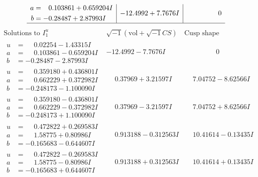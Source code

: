 \documentclass[1p]{elsarticle_modified}
\theoremstyle{definition}
\newcommand{\I}{\sqrt{-1}}
\begin{document}
$$\begin{array}{c|c|c}
\begin{aligned}
a &= \phantom{-}0.103861 + 0.659204 I \\
b &= -0.28487 + 2.87993 I\end{aligned}
 & -12.4992 + 7.7676 I & \phantom{-0.000000 } 0\\
 \hline 
 \end{array}$$\newpage$$\begin{array}{c|c|c}  
\text{Solutions to }I^u_{1}& \I (\text{vol} + \sqrt{-1}CS) & \text{Cusp shape}\\
 \hline 
\begin{aligned}
u &= \phantom{-}0.02254 - 1.43315 I \\
a &= \phantom{-}0.103861 - 0.659204 I \\
b &= -0.28487 - 2.87993 I\end{aligned}
 & -12.4992 - 7.7676 I & \phantom{-0.000000 } 0 \\ \hline\begin{aligned}
u &= \phantom{-}0.359180 + 0.436801 I \\
a &= \phantom{-}0.662229 + 0.372982 I \\
b &= -0.248173 - 1.100090 I\end{aligned}
 & \phantom{-}0.37969 + 3.21597 I & \phantom{-}7.04752 - 8.62566 I \\ \hline\begin{aligned}
u &= \phantom{-}0.359180 - 0.436801 I \\
a &= \phantom{-}0.662229 - 0.372982 I \\
b &= -0.248173 + 1.100090 I\end{aligned}
 & \phantom{-}0.37969 - 3.21597 I & \phantom{-}7.04752 + 8.62566 I \\ \hline\begin{aligned}
u &= \phantom{-}0.472822 + 0.269583 I \\
a &= \phantom{-}1.58775 + 0.80986 I \\
b &= -0.165683 - 0.644607 I\end{aligned}
 & \phantom{-}0.913188 - 0.312563 I & \phantom{-}10.41614 - 0.13435 I \\ \hline\begin{aligned}
u &= \phantom{-}0.472822 - 0.269583 I \\
a &= \phantom{-}1.58775 - 0.80986 I \\
b &= -0.165683 + 0.644607 I\end{aligned}
 & \phantom{-}0.913188 + 0.312563 I & \phantom{-}10.41614 + 0.13435 I \\ \hline\begin{aligned}

\end{aligned}
\end{array}$$
\end{document}
